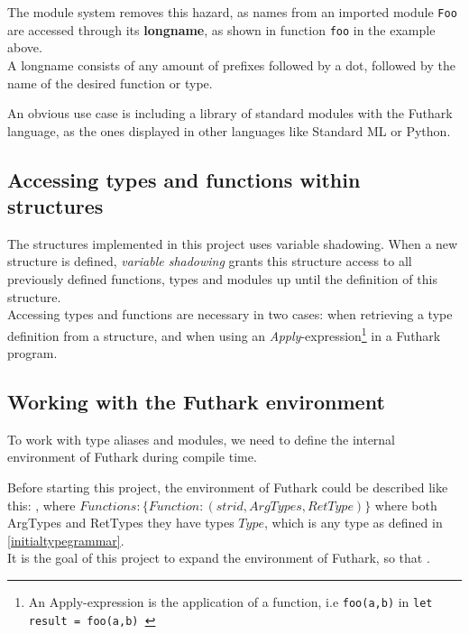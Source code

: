 The module system removes this hazard, as names from an imported module
\texttt{Foo} are accessed through its \textbf{longname}, as shown in function
\texttt{foo} in the example above.
\\
A longname consists of any amount of prefixes followed by a dot, followed by the
name of the desired function or type.

An obvious use case is including a library of standard modules with the Futhark
language, as the ones displayed in other languages like Standard
ML\cite{sml_standard_lib} or Python\cite{python3_docs}.


\subsection{Accessing types and functions within structures}
The structures implemented in this project uses variable shadowing.
When a new structure is defined, \textit{variable shadowing} grants this
structure access to all previously defined functions, types and modules up until
the definition of this structure.\\

Accessing types and functions are necessary in two cases: when retrieving a type
definition from a structure, and when using an
\textit{Apply}-expression\footnote{An Apply-expression is the application of a
  function, i.e \texttt{foo(a,b)} in \texttt{let result = foo(a,b) }} in a
Futhark program.

\subsection{Working with the Futhark environment}

To work with type aliases and modules, we need to define the internal
environment of Futhark during compile time.

Before starting this project, the environment of Futhark could be described like
this:
, where $Functions : \{ Function : (strid,
  ArgTypes, RetType) \}$ where both ArgTypes and RetTypes they
have types $Type$, which is any type as defined in
\ref{initialtypegrammar}.\\

It is the goal of this project to expand the environment of Futhark, so that
.


